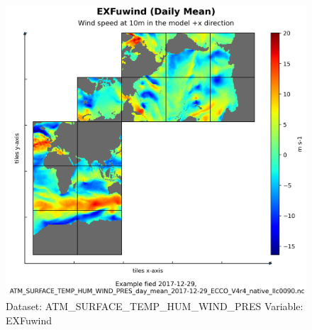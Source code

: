 \begin{figure}[H]
\centering
\includegraphics[scale=0.55]{../images/plots/native_plots/Atmosphere_Surface_Temperature_Humidity_Wind_and_Pressure/EXFuwind.png}
\caption{Dataset: ATM\_SURFACE\_TEMP\_HUM\_WIND\_PRES Variable: EXFuwind}
\label{tab:table-ATM_SURFACE_TEMP_HUM_WIND_PRES_EXFuwind-Plot}
\end{figure}
\pagebreak
